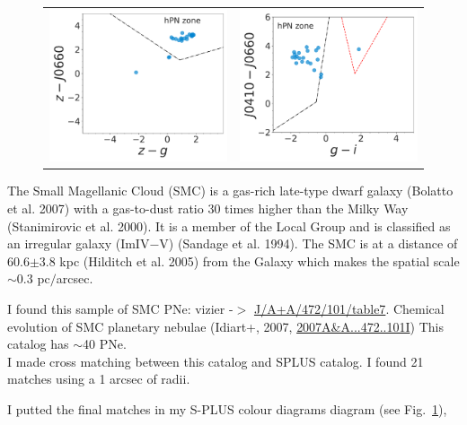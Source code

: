 \documentclass[11pt]{article}
\newcommand\raiselabel[1]{\raisebox{0.9\figwidth}[-0.5\figwidth]{#1}}
\begin{document}
\begin{figure}
\begin{tabular}{l l}
\includegraphics[width=0.5\linewidth, trim=10 10 10 10, clip]{Fig3-IDR2-SPLUS-z.pdf} & \includegraphics[width=0.5\linewidth, trim=10 10 10 10, clip]{Fig5-IDR2-SPLUS-gi.pdf} \\
\end{tabular}
\caption{}
\label{fig:smppne}
\end{figure}

The Small Magellanic Cloud (SMC) is a gas-rich late-type dwarf galaxy (Bolatto et al. 2007) with a gas-to-dust ratio 30 times higher than the Milky Way (Stanimirovic et al. 2000). It is a member of the Local Group and is classified as an irregular galaxy (ImIV$-$V) (Sandage et al. 1994). The SMC is at a distance of 60.6$\pm$3.8 kpc (Hilditch et al. 2005) from the Galaxy which makes the spatial scale $\sim$0.3 pc$/$arcsec.

I found this sample of SMC PNe: vizier -$>$ \url{J/A+A/472/101/table7}. Chemical evolution of SMC planetary nebulae (Idiart+, 2007, \url{2007A&A...472..101I}) This catalog has $\sim$40 PNe.\\

I made cross matching between this catalog and SPLUS catalog. I found 21 matches using a 1 arcsec of radii. 

I putted the final matches in my S-PLUS colour diagrams diagram (see Fig.~\ref{fig:smppne}),
\end{document}
